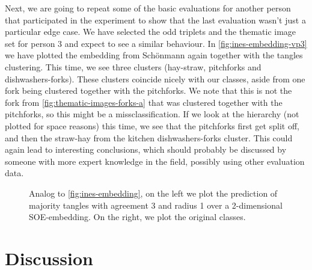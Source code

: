 Next, we are going to repeat some of the basic evaluations for another person that participated in the experiment to show that the last evaluation wasn't just a particular edge case.
We have selected the odd triplets and the thematic image set for person 3 and expect to see a similar behaviour. In \autoref{fig:ines-embedding-vp3} we have plotted the embedding
from Schönmann again together with the tangles clustering. This time, we see three clusters (hay-straw, pitchforks and dishwashers-forks). These clusters coincide nicely
with our classes, aside from one fork being clustered together with the pitchforks. We note that this is not the fork from \autoref{fig:thematic-images-forks-a} that was clustered together 
with the pitchforks, so this might be a missclassification. 
If we look at the hierarchy (not plotted for space reasons) this time, we see that the pitchforks first get split off, and then the straw-hay from the kitchen dishwashers-forks cluster.
This could again lead to interesting conclusions, which should probably be discussed by someone with more expert knowledge in the field, possibly using other evaluation data.

\onecolumn
\begin{figure}[ht]
    \centering
    \caption{
        Analog to \autoref{fig:ines-embedding}, on the left we plot the prediction of majority tangles with agreement 3 and radius 1 over 
        a 2-dimensional SOE-embedding. On the right, we plot the original classes.
    }
    \label{fig:ines-embedding-vp3}
\end{figure}


\section{Discussion}



